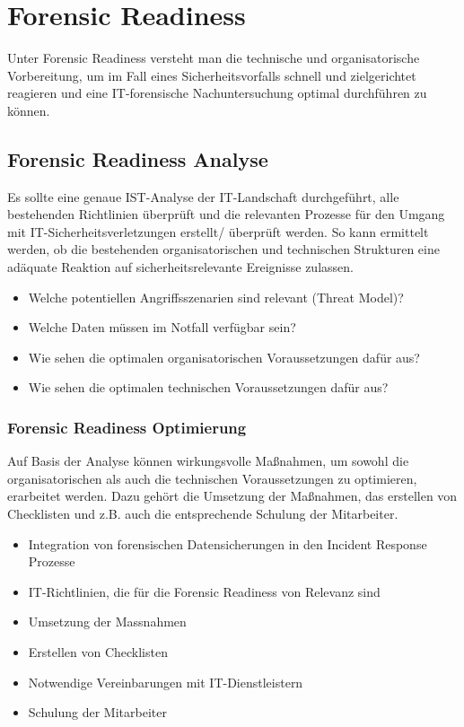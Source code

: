 \section{Forensic Readiness}
Unter Forensic Readiness versteht man die technische und organisatorische Vorbereitung, um im Fall eines Sicherheitsvorfalls schnell und zielgerichtet reagieren und eine IT-forensische Nachuntersuchung optimal durchführen zu können.

\subsection{Forensic Readiness Analyse}
Es sollte eine genaue IST-Analyse der IT-Landschaft durchgeführt, alle bestehenden Richtlinien überprüft und die relevanten Prozesse für den Umgang mit IT-Sicherheitsverletzungen erstellt/ überprüft werden. So kann ermittelt werden, ob die bestehenden organisatorischen und technischen Strukturen eine adäquate Reaktion auf sicherheitsrelevante Ereignisse zulassen.\\

\begin{itemize}
    \item Welche potentiellen Angriffsszenarien sind relevant (Threat Model)?
    \item Welche Daten müssen im Notfall verfügbar sein?
    \item Wie sehen die optimalen organisatorischen Voraussetzungen dafür aus?
    \item Wie sehen die optimalen technischen Voraussetzungen dafür aus?
\end{itemize}

\subsubsection{Forensic Readiness Optimierung}
Auf Basis der Analyse können wirkungsvolle Maßnahmen, um sowohl die organisatorischen als auch die technischen Voraussetzungen zu optimieren, erarbeitet werden. Dazu gehört die Umsetzung der Maßnahmen, das erstellen von Checklisten und z.B. auch die entsprechende Schulung der Mitarbeiter.\\

\begin{itemize}
    \item Integration von forensischen Datensicherungen in den Incident Response Prozesse
    \item IT-Richtlinien, die für die Forensic Readiness von Relevanz sind
    \item Umsetzung der Massnahmen
    \item Erstellen von Checklisten
    \item Notwendige Vereinbarungen mit IT-Dienstleistern
    \item Schulung der Mitarbeiter
\end{itemize}

